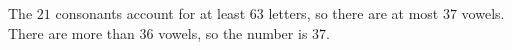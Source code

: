 The $21$ consonants account for at least $63$ letters, so there are at most $37$ vowels. There are more than $36$ vowels, so the number is $\boxed{37}$.
